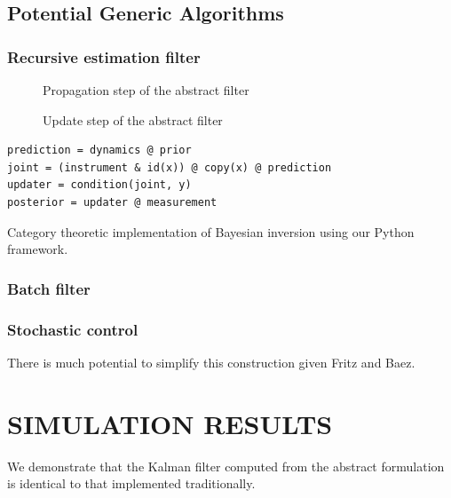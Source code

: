 \documentclass[letterpaper, 10 pt, conference]{ieeeconf}  %
\begin{document}
\subsection{Potential Generic Algorithms}
\subsubsection{Recursive estimation filter}

\begin{figure}[thpb]
    \framebox{\parbox{3in}{\centering}}
    \label{propagate-string}
    \caption{Propagation step of the abstract filter}
\end{figure}

\begin{figure}[thpb]
    \framebox{\parbox{3in}{\centering}}
    \label{update-string}
    \caption{Update step of the abstract filter}
\end{figure}

\begin{listing}
\begin{verbatim}
prediction = dynamics @ prior
joint = (instrument & id(x)) @ copy(x) @ prediction
updater = condition(joint, y)
posterior = updater @ measurement
\end{verbatim}
\caption{Category theoretic implementation of Bayesian inversion using our Python framework.}
\label{listing:filter}
\end{listing}

\subsubsection{Batch filter}
\subsubsection{Stochastic control}

There is much potential to simplify this construction given Fritz and Baez.

\section{SIMULATION RESULTS}

We demonstrate that the Kalman filter computed from the abstract formulation is identical to that implemented traditionally. 
\end{document}
